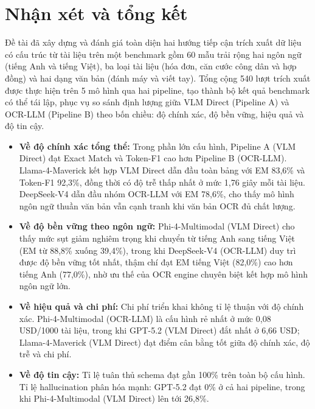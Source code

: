 ﻿\documentclass[12pt]{report}
\begin{document}
\section{Nhận xét và tổng kết}\label{sec:conclusion}

Đề tài đã xây dựng và đánh giá toàn diện hai hướng tiếp cận trích xuất dữ liệu có cấu trúc từ tài liệu trên một benchmark gồm 60 mẫu trải rộng hai ngôn ngữ (tiếng Anh và tiếng Việt), ba loại tài liệu (hóa đơn, căn cước công dân và hợp đồng) và hai dạng văn bản (đánh máy và viết tay). Tổng cộng 540 lượt trích xuất được thực hiện trên 5 mô hình qua hai pipeline, tạo thành bộ kết quả benchmark có thể tái lập, phục vụ so sánh định lượng giữa VLM Direct (Pipeline A) và OCR-LLM (Pipeline B) theo bốn chiều: độ chính xác, độ bền vững, hiệu quả và độ tin cậy.

\begin{itemize}
    \item \textbf{Về độ chính xác tổng thể:} Trong phần lớn cấu hình, Pipeline A (VLM Direct) đạt Exact Match và Token-F1 cao hơn Pipeline B (OCR-LLM). Llama-4-Maverick kết hợp VLM Direct dẫn đầu toàn bảng với EM 83,6\% và Token-F1 92,3\%, đồng thời có độ trễ thấp nhất ở mức 1,76 giây mỗi tài liệu. DeepSeek-V4 dẫn đầu nhóm OCR-LLM với EM 78,6\%, cho thấy mô hình ngôn ngữ thuần văn bản vẫn cạnh tranh khi văn bản OCR đủ chất lượng.

    \item \textbf{Về độ bền vững theo ngôn ngữ:} Phi-4-Multimodal (VLM Direct) cho thấy mức sụt giảm nghiêm trọng khi chuyển từ tiếng Anh sang tiếng Việt (EM từ 88,8\% xuống 39,4\%), trong khi DeepSeek-V4 (OCR-LLM) duy trì được độ bền vững tốt nhất, thậm chí đạt EM tiếng Việt (82,0\%) cao hơn tiếng Anh (77,0\%), nhờ ưu thế của OCR engine chuyên biệt kết hợp mô hình ngôn ngữ lớn.

    \item \textbf{Về hiệu quả và chi phí:} Chi phí triển khai không tỉ lệ thuận với độ chính xác. Phi-4-Multimodal (OCR-LLM) là cấu hình rẻ nhất ở mức 0,08 USD/1000 tài liệu, trong khi GPT-5.2 (VLM Direct) đắt nhất ở 6,66 USD; Llama-4-Maverick (VLM Direct) đạt điểm cân bằng tốt giữa độ chính xác, độ trễ và chi phí.

    \item \textbf{Về độ tin cậy:} Tỉ lệ tuân thủ schema đạt gần 100\% trên toàn bộ cấu hình. Tỉ lệ hallucination phân hóa mạnh: GPT-5.2 đạt 0\% ở cả hai pipeline, trong khi Phi-4-Multimodal (VLM Direct) lên tới 26,8\%.
\end{itemize}
\end{document}
